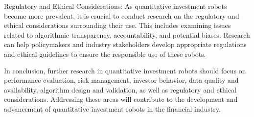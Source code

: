 \documentclass[UTF8]{ctexart}
\begin{document}
Regulatory and Ethical Considerations: As quantitative investment robots become more prevalent, it is crucial to conduct research on the regulatory and ethical considerations surrounding their use. This includes examining issues related to algorithmic transparency, accountability, and potential biases. Research can help policymakers and industry stakeholders develop appropriate regulations and ethical guidelines to ensure the responsible use of these robots.

In conclusion, further research in quantitative investment robots should focus on performance evaluation, risk management, investor behavior, data quality and availability, algorithm design and validation, as well as regulatory and ethical considerations. Addressing these areas will contribute to the development and advancement of quantitative investment robots in the financial industry.
\end{document}
